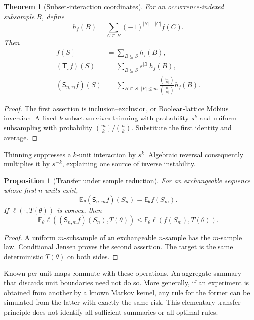 \documentclass[11pt]{article}
\numberwithin{equation}{section}
\newtheorem{theorem}{Theorem}[section]
\newtheorem{proposition}[proposition]{Proposition}
\theoremstyle{definition}
\theoremstyle{remark}
\newcommand{\E}{\mathbb E}
\newcommand{\Scal}{\mathsf S}
\newcommand{\Tcal}{\mathsf T}
\begin{document}
\begin{theorem}[Subset-interaction coordinates]\label{thm:mobius}
For an occurrence-indexed subsample $B$, define
\[
 h_f(B)=\sum_{C\subseteq B}(-1)^{|B|-|C|}f(C).
\]
Then
\begin{align}
 f(S)&=\sum_{B\subseteq S}h_f(B),\\
 (\Tcal_sf)(S)&=\sum_{B\subseteq S}s^{|B|}h_f(B),\label{eq:mobiusthin}\\
 (\Scal_{n,m}f)(S)&=\sum_{B\subseteq S:\,|B|\le m}
 \frac{\binom m{|B|}}{\binom n{|B|}}h_f(B).\label{eq:mobiussub}
\end{align}
\end{theorem}
\begin{proof}
The first assertion is inclusion--exclusion, or Boolean-lattice M\"obius inversion. A fixed $k$-subset survives thinning with probability $s^k$ and uniform subsampling with probability $\binom mk/\binom nk$. Substitute the first identity and average.
\end{proof}
Thinning suppresses a $k$-unit interaction by $s^k$. Algebraic reversal consequently multiplies it by $s^{-k}$, explaining one source of inverse instability.

\begin{proposition}[Transfer under sample reduction]\label{prop:transfer}
For an exchangeable sequence whose first $n$ units exist,
\[
 \E_\theta(\Scal_{n,m}f)(S_n)=\E_\theta f(S_m).
\]
If $\ell(\cdot,T(\theta))$ is convex, then
\[
 \E_\theta\ell((\Scal_{n,m}f)(S_n),T(\theta))
 \le\E_\theta\ell(f(S_m),T(\theta)).
\]
\end{proposition}
\begin{proof}
A uniform $m$-subsample of an exchangeable $n$-sample has the $m$-sample law. Conditional Jensen proves the second assertion. The target is the same deterministic $T(\theta)$ on both sides.
\end{proof}
Known per-unit maps commute with these operations. An aggregate summary that discards unit boundaries need not do so. More generally, if an experiment is obtained from another by a known Markov kernel, any rule for the former can be simulated from the latter with exactly the same risk. This elementary transfer principle does not identify all sufficient summaries or all optimal rules.
\end{document}
